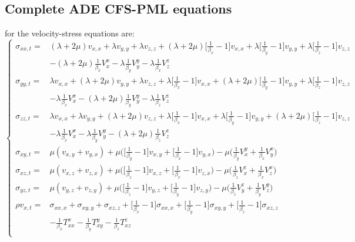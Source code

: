 \subsection{Complete ADE CFS-PML equations}
 for the velocity-stress equations are:
\begin{equation*}
 \left\{
  \begin{aligned}
    \sigma_{xx,t}= & (\lambda+2\mu)v_{x,x}+\lambda v_{y,y}+\lambda v_{z,z}+(\lambda+2\mu)\Big[\frac{1}{\beta_x}-1\Big]v_{x,x}+\lambda\Big[\frac{1}{\beta_y}-1\Big]v_{y,y}+\lambda\Big[\frac{1}{\beta_z}-1\Big]v_{z,z} \\
      & -(\lambda+2\mu)\frac{1}{\beta_x}V_x^x-\lambda\frac{1}{\beta_y}V_y^y-\lambda\frac{1}{\beta_x}V_z^z \\
    \sigma_{yy,t}= & \lambda v_{x,x}+(\lambda+2\mu)v_{y,y}+\lambda v_{z,z}+\lambda\Big[\frac{1}{\beta_x}-1\Big]v_{x,x}+(\lambda+2\mu)\Big[\frac{1}{\beta_y}-1\Big]v_{y,y}+\lambda\Big[\frac{1}{\beta_z}-1\Big]v_{z,z} \\
      & -\lambda\frac{1}{\beta_x}V_x^x-(\lambda+2\mu)\frac{1}{\beta_y}V_y^y-\lambda\frac{1}{\beta_z}V_z^z \\
    \sigma_{zz,t}= & \lambda v_{x,x}+\lambda v_{y,y}+(\lambda+2\mu)v_{z,z}+\lambda\Big[\frac{1}{\beta_x}-1\Big]v_{x,x}+\lambda\Big[\frac{1}{\beta_y}-1\Big]v_{y,y}+(\lambda+2\mu)\Big[\frac{1}{\beta_z}-1\Big]v_{z,z} \\
      & -\lambda\frac{1}{\beta_x}V_x^x-\lambda\frac{1}{\beta_y}V_y^y-(\lambda+2\mu)\frac{1}{\beta_z}V_z^z \\
    \sigma_{xy,t}= & \mu(v_{x,y}+v_{y,x})+\mu\Big(\Big[\frac{1}{\beta_y}-1\Big]v_{x,y}+\Big[\frac{1}{\beta_x}-1\Big]v_{y,x}\Big)-\mu\Big(\frac{1}{\beta_y}V_x^y+\frac{1}{\beta_x}V_y^x\Big) \\
    \sigma_{xz,t}= & \mu(v_{x,z}+v_{z,x})+\mu\Big(\Big[\frac{1}{\beta_z}-1\Big]v_{x,z}+\Big[\frac{1}{\beta_x}-1\Big]v_{z,x}\Big)-\mu\Big(\frac{1}{\beta_z}V_x^z+\frac{1}{\beta_x}V_z^x\Big) \\
    \sigma_{yz,t}= & \mu(v_{y,z}+v_{z,y})+\mu\Big(\Big[\frac{1}{\beta_z}-1\Big]v_{y,z}+\Big[\frac{1}{\beta_y}-1\Big]v_{z,y}\Big)-\mu\Big(\frac{1}{\beta_z}V_y^z+\frac{1}{\beta_y}V_z^y\Big) \\
    \rho v_{x,t}= & \sigma_{xx,x}+\sigma_{xy,y}+\sigma_{xz,z}+\Big[\frac{1}{\beta_x}-1\Big]\sigma_{xx,x}+\Big[\frac{1}{\beta_y}-1\Big]\sigma_{xy,y}+\Big[\frac{1}{\beta_z}-1\Big]\sigma_{xz,z} \\
      & -\frac{1}{\beta_x}T_{xx}^x-\frac{1}{\beta_y}T_{xy}^y-\frac{1}{\beta_z}T_{xz}^z \\

\end{aligned}
\end{equation*}
